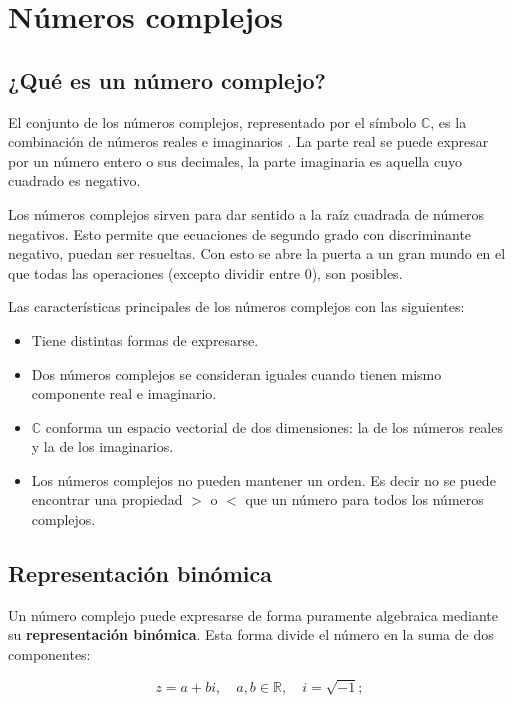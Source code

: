 \chapter{Números complejos}
\label{chap:numeros_complejos}

\section{¿Qué es un número complejo?}

El conjunto de los números complejos, representado por el símbolo $\mathbb{C}$, es la combinación de números reales e imaginarios \cite{ferrovial_numeros_complejos}. La parte real se puede expresar por un número entero o sus decimales, la parte imaginaria es aquella cuyo cuadrado es negativo.


Los números complejos sirven para dar sentido a la raíz cuadrada de números negativos. Esto permite que ecuaciones de segundo grado con discriminante negativo, puedan ser resueltas. Con esto se abre la puerta a un gran mundo en el que todas las operaciones (excepto dividir entre 0), son posibles.


Las características principales de los números complejos con las siguientes:

\begin{itemize}
    \item Tiene distintas formas de expresarse.
    \item Dos números complejos se consideran iguales cuando tienen mismo componente real e imaginario.
    \item $\mathbb{C}$ conforma un espacio vectorial de dos dimensiones: la de los números reales y la de los imaginarios.
    \item Los números complejos no pueden mantener un orden. Es decir no se puede encontrar una propiedad $>$ o $<$ que un número para todos los números complejos.
\end{itemize}


\section{Representación binómica}

Un número complejo puede expresarse de forma puramente algebraica mediante su \textbf{representación binómica}. Esta forma divide el número en la suma de dos componentes:

\[
    z = a + bi, \quad a, b \in \mathbb{R}, \quad i = \sqrt{-1};
\]

